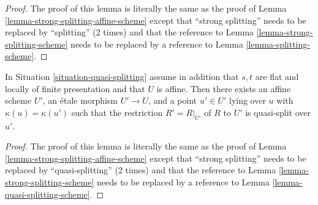 \begin{proof}
The proof of this lemma is literally the same as the proof of
Lemma \ref{lemma-strong-splitting-affine-scheme}
except that ``strong splitting'' needs to be replaced by ``splitting''
(2 times) and that the reference to
Lemma \ref{lemma-strong-splitting-scheme}
needs to be replaced by a reference to
Lemma \ref{lemma-splitting-scheme}.
\end{proof}

\begin{lemma}
\label{lemma-quasi-splitting-affine-scheme}
In Situation \ref{situation-quasi-splitting} assume in addition that
$s, t$ are flat and locally of finite presentation and that $U$ is affine.
Then there exists an affine scheme $U'$, an \'etale morphism
$U' \to U$, and a point $u' \in U'$ lying over $u$ with
$\kappa(u) = \kappa(u')$ such that the restriction $R' = R|_{U'}$ of
$R$ to $U'$ is quasi-split over $u'$.
\end{lemma}

\begin{proof}
The proof of this lemma is literally the same as the proof of
Lemma \ref{lemma-strong-splitting-affine-scheme}
except that ``strong splitting'' needs to be replaced by ``quasi-splitting''
(2 times) and that the reference to
Lemma \ref{lemma-strong-splitting-scheme}
needs to be replaced by a reference to
Lemma \ref{lemma-quasi-splitting-scheme}.
\end{proof}








